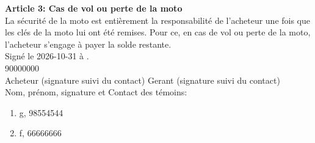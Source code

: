 \documentclass[12pt]{article}
\begin{document}
\textbf{Article 3: Cas de vol ou perte de la moto} \\
La sécurité de la moto est entièrement la responsabilité de l’acheteur une fois que les clés de la moto lui ont été remises. Pour ce, en cas de vol ou perte de la moto, l’acheteur s'engage à payer la solde restante.\\
Signé le 2026-10-31 à \underline{\hspace{5cm}}. \\


\hspace{3cm} 90000000 \hspace{5cm} \hspace{5cm} \\
Acheteur (signature suivi du contact) \hspace{3cm} Gerant (signature suivi du contact) \\
Nom, prénom, signature et Contact des témoins: 
\begin{enumerate}
	
		\item \hspace{5cm} g,  98554544
	
		\item \hspace{5cm} f,  66666666
	
\end{enumerate}
\end{document}

